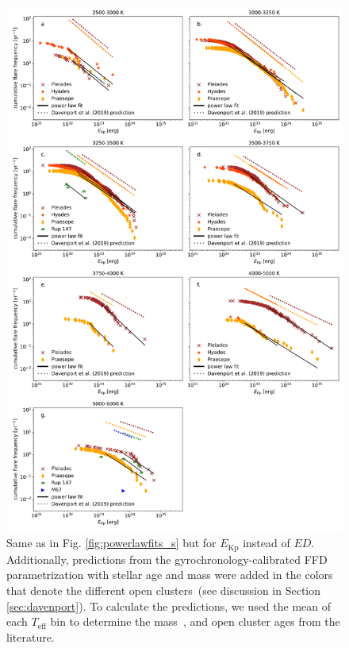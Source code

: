 \documentclass{aa}
\begin{document}
\begin{figure}[Ht!]
    \centering
    \includegraphics[width=14.5cm]{pics/FFDs/SpT_wise_sample_ffd_energy_wheatland.png}
    \caption{Same as in Fig. \ref{fig:powerlawfits_s} but for $E_\mathrm{Kp}$ instead of $ED$. Additionally, predictions from the \citet{davenport2019} gyrochronology-calibrated FFD parametrization with stellar age and mass were added in the colors that denote the different open clusters~(see discussion in Section \ref{sec:davenport}). To calculate the predictions, we used the mean of each $T_\mathrm{eff}$ bin to determine the mass~\citep{pecaut_intrinsic_2013}, and open cluster ages from the literature.}        	
    \label{fig:powerlawfits_erg}
\end{figure}
\end{document}
